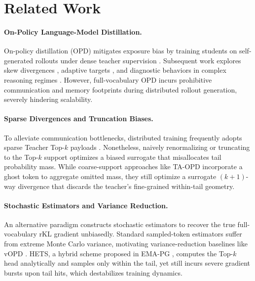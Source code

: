 \section{Related Work}

\paragraph{On-Policy Language-Model Distillation.}
On-policy distillation (OPD) mitigates exposure bias by training students on self-generated rollouts under dense teacher supervision \citep{gu2024minillm,agarwal2024policy}. Subsequent work explores skew divergences \citep{ko2024distillm}, adaptive targets \citep{jang2026stable,heo2026policy,jin2026entropy}, and diagnostic behaviors in complex reasoning regimes \citep{fu2026revisiting,zhu2026many}. However, full-vocabulary OPD incurs prohibitive communication and memory footprints during distributed rollout generation, severely hindering scalability.
\vspace{-4mm}
\paragraph{Sparse Divergences and Truncation Biases.}
To alleviate communication bottlenecks, distributed training frequently adopts sparse Teacher Top-$k$ payloads \citep{zhu2026many}. Nonetheless, naively renormalizing or truncating to the Top-$k$ support optimizes a biased surrogate that misallocates tail probability mass. While coarse-support approaches like TA-OPD \citep{huang2026tail} incorporate a ghost token \citep{anshumann-etal-2025-sparse} to aggregate omitted mass, they still optimize a surrogate $(k+1)$-way divergence that discards the teacher's fine-grained within-tail geometry.
\vspace{-4mm}
\paragraph{Stochastic Estimators and Variance Reduction.}
An alternative paradigm constructs stochastic estimators to recover the true full-vocabulary rKL gradient unbiasedly. Standard sampled-token estimators \citep{gu2024minillm,lu2025onpolicydistillation} suffer from extreme Monte Carlo variance, motivating variance-reduction baselines like vOPD \citep{oh2026kl}. HETS, a hybrid scheme proposed in EMA-PG \citep{zhang2026ema}, computes the Top-$k$ head analytically and samples only within the tail, yet still incurs severe gradient bursts upon tail hits, which destabilizes training dynamics.
